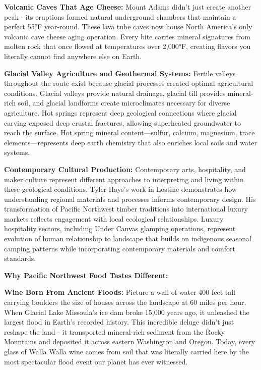 \documentclass[
  11pt,
  letterpaper,
  DIV=10,
  numbers=noendperiod]{scrartcl}
\begin{document}
\textbf{Volcanic Caves That Age Cheese:} Mount Adams didn't just create
another peak - its eruptions formed natural underground chambers that
maintain a perfect 55°F year-round. These lava tube caves now house
North America's only volcanic cave cheese aging operation. Every bite
carries mineral signatures from molten rock that once flowed at
temperatures over 2,000°F, creating flavors you literally cannot find
anywhere else on Earth.

\textbf{Glacial Valley Agriculture and Geothermal Systems:} Fertile
valleys throughout the route exist because glacial processes created
optimal agricultural conditions. Glacial valleys provide natural
drainage, glacial till provides mineral-rich soil, and glacial landforms
create microclimates necessary for diverse agriculture. Hot springs
represent deep geological connections where glacial carving exposed deep
crustal fractures, allowing superheated groundwater to reach the
surface. Hot spring mineral content---sulfur, calcium, magnesium, trace
elements---represents deep earth chemistry that also enriches local
soils and water systems.

\textbf{Contemporary Cultural Production:} Contemporary arts,
hospitality, and maker culture represent different approaches to
interpreting and living within these geological conditions. Tyler Hays's
work in Lostine demonstrates how understanding regional materials and
processes informs contemporary design. His transformation of Pacific
Northwest timber traditions into international luxury markets reflects
engagement with local ecological relationships. Luxury hospitality
sectors, including Under Canvas glamping operations, represent evolution
of human relationship to landscape that builds on indigenous seasonal
camping patterns while incorporating contemporary materials and comfort
standards.

\textbf{Why Pacific Northwest Food Tastes Different:}

\textbf{Wine Born From Ancient Floods:} Picture a wall of water 400 feet
tall carrying boulders the size of houses across the landscape at 60
miles per hour. When Glacial Lake Missoula's ice dam broke 15,000 years
ago, it unleashed the largest flood in Earth's recorded history. This
incredible deluge didn't just reshape the land - it transported
mineral-rich sediment from the Rocky Mountains and deposited it across
eastern Washington and Oregon. Today, every glass of Walla Walla wine
comes from soil that was literally carried here by the most spectacular
flood event our planet has ever witnessed.
\end{document}
